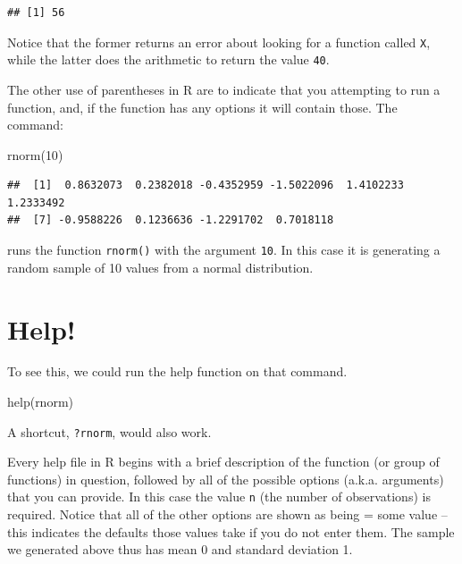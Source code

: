 \documentclass[
]{book}
\newenvironment{Shaded}{\begin{snugshade}}{\end{snugshade}}
\newcommand{\DecValTok}[1]{\textcolor[rgb]{0.00,0.00,0.81}{#1}}
\newcommand{\FunctionTok}[1]{\textcolor[rgb]{0.00,0.00,0.00}{#1}}
\newcommand{\NormalTok}[1]{#1}
\begin{document}
\begin{verbatim}
## [1] 56
\end{verbatim}

Notice that the former returns an error about looking for a function called \texttt{X}, while the latter does the arithmetic to return the value \texttt{40}.

The other use of parentheses in R are to indicate that you attempting to run a function, and, if the function has any options it will contain those. The command:

\begin{Shaded}
\begin{Highlighting}[]
\FunctionTok{rnorm}\NormalTok{(}\DecValTok{10}\NormalTok{)}
\end{Highlighting}
\end{Shaded}

\begin{verbatim}
##  [1]  0.8632073  0.2382018 -0.4352959 -1.5022096  1.4102233  1.2333492
##  [7] -0.9588226  0.1236636 -1.2291702  0.7018118
\end{verbatim}

runs the function \texttt{rnorm()} with the argument \texttt{10}. In this case it is generating a random sample of 10 values from a normal distribution.

\hypertarget{help}{%
\section{Help!}\label{help}}

To see this, we could run the help function on that command.

\begin{Shaded}
\begin{Highlighting}[]
\FunctionTok{help}\NormalTok{(rnorm)}
\end{Highlighting}
\end{Shaded}

A shortcut, \texttt{?rnorm}, would also work.

Every help file in R begins with a brief description of the function (or group of functions) in question, followed by all of the possible options (a.k.a. arguments) that you can provide. In this case the value \texttt{n} (the number of observations) is required. Notice that all of the other options are shown as being = some value -- this indicates the defaults those values take if you do not enter them. The sample we generated above thus has mean 0 and standard deviation 1.
\end{document}
